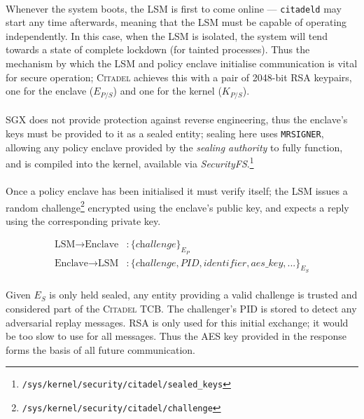 \paragraph{} Whenever the system boots, the LSM is first to come online --- \texttt{citadeld} may start any time afterwards, meaning that the LSM must be capable of operating independently. In this case, when the LSM is isolated, the system will tend towards a state of complete lockdown (for tainted processes). Thus the mechanism by which the LSM and policy enclave initialise communication is vital for secure operation; \textsc{Citadel} achieves this with a pair of 2048-bit RSA keypairs, one for the enclave ($E_{P/S}$) and one for the kernel ($K_{P/S}$).

\paragraph{} SGX does not provide protection against reverse engineering, thus the enclave's keys must be provided to it as a sealed entity; sealing here uses \texttt{MRSIGNER}, allowing any policy enclave provided by the \textit{sealing authority} to fully function, and is compiled into the kernel, available via \textit{SecurityFS}.\footnote{\texttt{/sys/kernel/security/citadel/sealed\_keys}}

\paragraph{} Once a policy enclave has been initialised it must verify itself; the LSM issues a random challenge\footnote{\texttt{/sys/kernel/security/citadel/challenge}} encrypted using the enclave's public key, and expects a reply using the corresponding private key.

\vspace{-5mm}
\begin{align*}
    \text{LSM} \rightarrow \text{Enclave} &: \{\textit{challenge}\}_{E_{P}} \\
    \text{Enclave} \rightarrow \text{LSM} &: \{\textit{challenge}, \textit{PID}, \textit{identifier}, \textit{aes\_key}, ...\}_{E_{S}}
\end{align*}

\paragraph{} Given $E_S$ is only held sealed, any entity providing a valid challenge is trusted and considered part of the \textsc{Citadel} TCB. The challenger's PID is stored to detect any adversarial replay messages. RSA is only used for this initial exchange; it would be too slow to use for all messages. Thus the AES key provided in the response forms the basis of all future communication.

